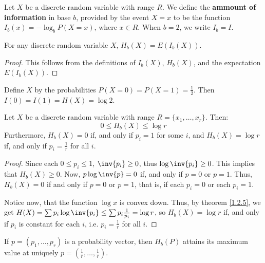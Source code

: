\begin{definition}
    Let $X$ be a discrete random variable with range  $R$. We define the
    \textbf{ammount of information} in base $b$, provided by the event $X=x$ to
    be the function $I_b(x)=-\log_b{P(X=x)}$, where $x \in R$. When $b=2$, we
    write  $I_b=I$.
\end{definition}

\begin{lemma}\label{2.1.1}
    For any discrete random variable $X$, $H_b(X)=E(I_b(X))$.
\end{lemma}
\begin{proof}
    This follows from the definitions of $I_b(X)$, $H_b(X)$, and the expectation
    $E(I_b(X))$.
\end{proof}

\begin{example}
    Define $X$ by the probabilities  $P(X=0)=P(X=1)=\frac{1}{2}$. Then
    $I(0)=I(1)=H(X)=\log{2}$.
\end{example}

\begin{theorem}\label{2.1.2}
    Let $X$ be a discrete random variable with range  $R=\{x_1, \dots, x_r\}$.
    Then:
    \begin{equation}
        0 \leq H_b(X) \leq \log{r}
    \end{equation}
    Furthermore, $H_b(X)=0$ if, and only if $p_i=1$ for some  $i$, and
    $H_b(X)=\log{r}$ if, and only if $p_i=\frac{1}{r}$ for all $i$.
\end{theorem}
\begin{proof}
    Since each $0 \leq p_i \leq 1$, $\inv{p_i} \geq 0$, thus $\log{\inv{p_i}}
    \geq 0$. This implies that $H_b(X) \geq 0$. Now, $p\log{\inv{p}}=0$ if, and
    only if $p=0$ or  $p=1$. Thus,  $H_b(X)=0$ if and only if $p=0$ or  $p=1$,
    that is, if each $p_i=0$ or each  $p_i=1$.

    Notice now, that the function  $\log{x}$ is convex down. Thus, by theorem
    \ref{1.2.5}, we get $H(X)=\sum{p_i\log{\inv{p_i}}} \leq
    \sum{p_i\frac{1}{p_i}}=\log{r}$, so $H_b(X)=\log{r}$ if, and only if $p_i$
    is constant for each  $i$, i.e.  $p_i=\frac{1}{r}$ for all $i$.
\end{proof}
\begin{corollary}
    If $p=(p_1, \dots, p_r)$ is a probability vector, then $H_b(P)$ attains its
    maximum value at uniquely $p=(\frac{1}{r}, \dots, \frac{1}{r})$.
\end{corollary}

